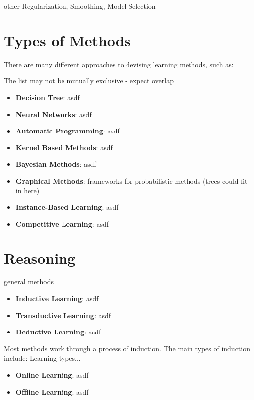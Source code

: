 \documentclass[a4paper, 11pt]{article}
\begin{document}
other
Regularization, Smoothing, Model Selection



\section{Types of Methods}
\label{sec:methods}
There are many different approaches to devising learning methods, such as:

The list may not be mutually exclusive - expect overlap

\begin{itemize}
	\item \textbf{Decision Tree}: asdf
	\item \textbf{Neural Networks}: asdf
	\item \textbf{Automatic Programming}: asdf
	\item \textbf{Kernel Based Methods}: asdf
	\item \textbf{Bayesian Methods}: asdf
	\item \textbf{Graphical Methods}: frameworks for probabilistic methods (trees could fit in here)
	
	\item \textbf{Instance-Based Learning}: asdf
	\item \textbf{Competitive Learning}: asdf
	
\end{itemize}


\section{Reasoning}
\label{sec:reasoning}

general methods

\begin{itemize}
	\item \textbf{Inductive Learning}: asdf
	\item \textbf{Transductive Learning}: asdf
	\item \textbf{Deductive Learning}: asdf
\end{itemize}


Most methods work through a process of induction. The main types of induction include:
Learning types...

\begin{itemize}
	\item \textbf{Online Learning}: asdf
	\item \textbf{Offline Learning}: asdf
\end{itemize}
\end{document}
